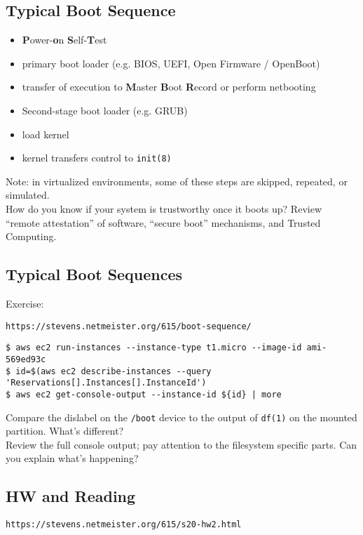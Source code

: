 \documentclass[xga]{xdvislides}
\begin{document}
\subsection{Typical Boot Sequence}
\begin{itemize}
	\item {\bf P}ower-{\bf o}n {\bf S}elf-{\bf T}est
	\item primary boot loader (e.g. BIOS, UEFI, Open Firmware / OpenBoot)
	\item transfer of execution to {\bf M}aster {\bf B}oot {\bf R}ecord or perform netbooting
	\item Second-stage boot loader (e.g. GRUB)
	\item load kernel
	\item kernel transfers control to {\tt init(8)}
\end{itemize}
\vspace{.5in}
Note: in virtualized environments, some of these steps
are skipped, repeated, or simulated. \\

\vspace{.25in}
How do you know if your system is trustworthy once it
boots up? Review ``remote attestation'' of software,
``secure boot'' mechanisms, and Trusted Computing.

\subsection{Typical Boot Sequences}
Exercise:

\verb+https://stevens.netmeister.org/615/boot-sequence/+
\vspace*{\fill}
\begin{verbatim}
$ aws ec2 run-instances --instance-type t1.micro --image-id ami-569ed93c
$ id=$(aws ec2 describe-instances --query 'Reservations[].Instances[].InstanceId')
$ aws ec2 get-console-output --instance-id ${id} | more
\end{verbatim}
\vspace{.5in}
Compare the dislabel on the {\tt /boot} device to the
output of {\tt df(1)} on the mounted partition.
What's different? \\

Review the full console output; pay attention to the
filesystem specific parts.  Can you explain what's
happening?
\vspace*{\fill}

\subsection{HW and Reading}
\verb+https://stevens.netmeister.org/615/s20-hw2.html+
\end{document}

